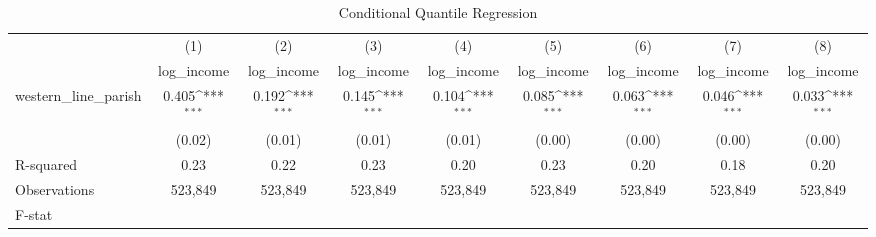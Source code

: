\begin{table}[htbp]\centering
\def\sym#1{\ifmmode^{#1}\else\(^{#1}\)\fi}
\caption{Conditional Quantile Regression}
\begin{tabular}{l*{8}{c}}
\hline\hline
                    &\multicolumn{1}{c}{(1)}&\multicolumn{1}{c}{(2)}&\multicolumn{1}{c}{(3)}&\multicolumn{1}{c}{(4)}&\multicolumn{1}{c}{(5)}&\multicolumn{1}{c}{(6)}&\multicolumn{1}{c}{(7)}&\multicolumn{1}{c}{(8)}\\
                    &\multicolumn{1}{c}{log\_income}&\multicolumn{1}{c}{log\_income}&\multicolumn{1}{c}{log\_income}&\multicolumn{1}{c}{log\_income}&\multicolumn{1}{c}{log\_income}&\multicolumn{1}{c}{log\_income}&\multicolumn{1}{c}{log\_income}&\multicolumn{1}{c}{log\_income}\\
\hline
western\_line\_parish &       0.405\sym{***}&       0.192\sym{***}&       0.145\sym{***}&       0.104\sym{***}&       0.085\sym{***}&       0.063\sym{***}&       0.046\sym{***}&       0.033\sym{***}\\
                    &      (0.02)         &      (0.01)         &      (0.01)         &      (0.01)         &      (0.00)         &      (0.00)         &      (0.00)         &      (0.00)         \\
\hline
R-squared           &        0.23         &        0.22         &        0.23         &        0.20         &        0.23         &        0.20         &        0.18         &        0.20         \\
Observations        &     523,849         &     523,849         &     523,849         &     523,849         &     523,849         &     523,849         &     523,849         &     523,849         \\
F-stat              &                     &                     &                     &                     &                     &                     &                     &                     \\
\hline\hline
\end{tabular}
\end{table}
